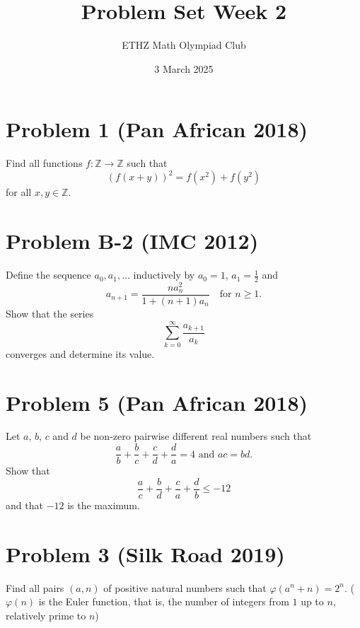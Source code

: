 \documentclass[11pt, a4paper, oneside]{article}
\title{Problem Set Week 2}
\author{ETHZ Math Olympiad Club}
\date{3 March 2025}
\newcommand{\problem}[1][]{\section{#1} \hfill \par}
\theoremstyle{remark}
\begin{document}
\maketitle
\problem[Problem 1 (Pan African 2018)]
Find all functions $f : \mathbb Z \to \mathbb Z$ such that $$(f(x + y))^2 = f(x^2) + f(y^2)$$ for all $x, y \in \mathbb Z$.

\problem[Problem B-2 (IMC 2012)]
Define the sequence \( a_0, a_1, \dots \) inductively by \( a_0 = 1 \), \( a_1 = \frac{1}{2} \) and
\[
a_{n+1} = \frac{n a_n^2}{1 + (n+1)a_n} \quad \text{for } n \geq 1.
\]
Show that the series 
\[
\sum_{k=0}^{\infty} \frac{a_{k+1}}{a_k}
\]
converges and determine its value.

\problem[Problem 5 (Pan African 2018)]
Let $a$, $b$, $c$ and $d$ be non-zero pairwise different real numbers such that
$$
  \frac{a}{b} + \frac{b}{c} + \frac{c}{d} + \frac{d}{a} = 4 \text{ and } ac = bd.
$$
Show that
$$
  \frac{a}{c} + \frac{b}{d} + \frac{c}{a} + \frac{d}{b} \leq -12
$$and that $-12$ is the maximum.

\problem[Problem 3 (Silk Road 2019)]
Find all pairs $ (a, n) $ of positive natural numbers such that $ \varphi (a ^ n + n) = 2 ^ n. $
($ \varphi (n) $ is the Euler function, that is, the number of integers from $1$ up to $ n $, relatively prime to $ n $)
\end{document}
